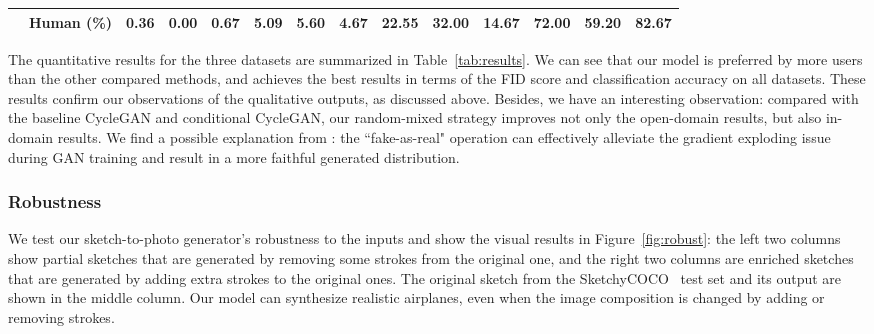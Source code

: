 \documentclass[10pt,twocolumn,letterpaper]{article}
\begin{document}
\begin{table*}[t]
{\begin{tabular}{c|c|ccc|ccc|ccc|ccc}
            & Human (\%) &  0.36    & 0.00   &   0.67    &  5.09   & 5.60   &   4.67  &  22.55   & 32.00   &   14.67    &   \textbf{72.00}                        &       \textbf{59.20}                    &         \textbf{82.67}                   \\ 
\hline
\end{tabular}
}
\caption{Quantitative evaluation and user study on Scribble and SketchyCOCO datasets. We show the full testset results, in-domain results, and open-domain results, respectively. Best results are shown in \textbf{bold}.}


\label{tab:results}
\end{table*}

The quantitative results for the three datasets are summarized in Table~\ref{tab:results}. We can see that our model is preferred by more users than the other compared methods, and achieves the best results in terms of the FID score and classification accuracy on all datasets. These results confirm our observations of the qualitative outputs, as discussed above. Besides, we have an interesting observation: compared with the baseline CycleGAN and conditional CycleGAN, our random-mixed strategy improves not only the open-domain results, but also in-domain results. We find a possible explanation from \cite{tao2020alleviation}: the ``fake-as-real" operation can effectively alleviate the gradient exploding issue during GAN training and result in a more faithful generated distribution.



\subsubsection{Robustness}
\label{sec:exp_robust}
We test our sketch-to-photo generator's robustness to the inputs and show the visual results in Figure~\ref{fig:robust}: the left two columns show partial sketches that are generated by removing some strokes from the original one, and the right two columns are enriched sketches that are generated by adding extra strokes to the original ones. The original sketch from the SketchyCOCO~\cite{gao2020sketchycoco} test set and its output are shown in the middle column. Our model can synthesize realistic airplanes, even when the image composition is changed by adding or removing strokes. 
\end{document}
